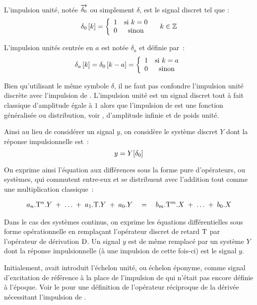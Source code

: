 \begin{definition}
  \label{def:impulsion_unite}
  L'impulsion unité, notée $\d0$ ou simplement $\delta$, est le signal discret tel que :
  $$
  \delta_0\left[k\right]=\left\{\begin{array}{cc} {1} & {\text{si } k=0}\\ {0} & {\text{sinon}}\\ \end{array}\right. \quad k\in\mathbb{Z}
  $$

  L'impulsion unités centrée en $a$ est notée $\delta_a$ et définie par~:
  $$
  \delta_a\left[k\right]=\delta_0\left[k-a\right] = \left\{\begin{array}{cc} {1} & {\text{si } k=a}\\ {0} & {\text{sinon}}\\ \end{array}\right.
  $$

  Bien qu'utilisant le même symbole $\delta$, il ne faut pas confondre
  l'impulsion unité discrète avec l'impulsion de \Dirac. L'impulsion
  unité est un signal discret tout à fait classique d'amplitude égale
  à $1$ alors que l'impulsion de \Dirac{} est une fonction généralisée
  ou distribution, voir , d'amplitude infinie et de
  poids unité.
\end{definition}

Ainsi au lieu de considérer un signal $y$, on considère le système discret $Y$ dont la réponse impulsionnelle est~:
\begin{equation}
  y = Y\!\left[\delta_0\right]
\end{equation}



On exprime ainsi l'équation aux différences sous la forme pure
d'opérateurs, ou systèmes, qui commutent entre-eux et se distribuent
avec l'addition tout comme une multiplication classique~:

\begin{eqnarray}
  a_n.\mathrm{T}^n.Y\; +\; \ldots \;+\; a_1.\mathrm{T}.Y \;+\; a_0.Y \quad  = \quad b_m.\mathrm{T}^m.X \;+\; \ldots \;+\; b_0.X
\end{eqnarray}

\begin{remarque}
  Dans le cas des systèmes continus, on exprime les équations
  différentielles sous forme opérationnelle en remplaçant l'opérateur
  discret de retard $\mathrm{T}$ par l'opérateur de dérivation $\mathrm{D}$. Un
  signal $y$ est de même remplacé par un système $Y$ dont la réponse
  impulsionnelle (à une impulsion de \Dirac{} cette fois-ci) est le
  signal $y$.

  Initialement, \Heaviside{} avait introduit l'échelon unité, ou
  échelon éponyme, comme signal d'excitation de référence à la place
  de l'impulsion de \Dirac{} qui n'était pas encore définie à
  l'époque. Voir le  pour une définition de
  l'opérateur réciproque de la dérivée nécessitant l'impulsion de
  \Dirac{}.
\end{remarque}


